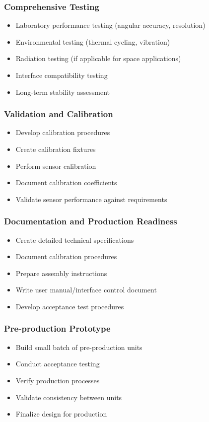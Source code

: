\subsubsection*{Comprehensive Testing}
\begin{itemize}
  \item Laboratory performance testing (angular accuracy, resolution)
  \item Environmental testing (thermal cycling, vibration)
  \item Radiation testing (if applicable for space applications)
  \item Interface compatibility testing
  \item Long-term stability assessment
\end{itemize}

\subsubsection*{Validation and Calibration}
\begin{itemize}
  \item Develop calibration procedures
  \item Create calibration fixtures
  \item Perform sensor calibration
  \item Document calibration coefficients
  \item Validate sensor performance against requirements
\end{itemize}

\subsubsection*{Documentation and Production Readiness}
\begin{itemize}
  \item Create detailed technical specifications
  \item Document calibration procedures
  \item Prepare assembly instructions
  \item Write user manual/interface control document
  \item Develop acceptance test procedures
\end{itemize}

\subsubsection*{Pre-production Prototype}
\begin{itemize}
  \item Build small batch of pre-production units
  \item Conduct acceptance testing
  \item Verify production processes
  \item Validate consistency between units
  \item Finalize design for production
\end{itemize}

